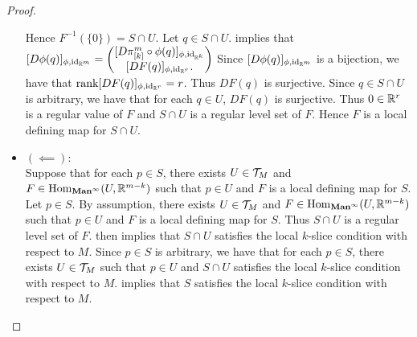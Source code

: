 \documentclass{book}
\begin{document}
\begin{proof}
\begin{itemize}
			Hence $F^{-1}(\{0\}) = S \cap U$. Let $q \in S \cap U$.  implies that $[D \phi (q)]_{\phi, \operatorname{id}_{\mathbb{R}^m}} = 
			\begin{pmatrix}
				[D \pi^m_{[k]} \circ \phi (q) ]_{\phi, \operatorname{id}_{\mathbb{R}^k}} \\
				[DF(q)]_{\phi, \operatorname{id}_{\mathbb{R}^r}}. 
			\end{pmatrix}
			$ 
			Since $[D \phi (q)]_{\phi, \operatorname{id}_{\mathbb{R}^m}}$ is a bijection, we have that $\operatorname{\text{rank}} [DF(q)]_{\phi, \operatorname{id}_{\mathbb{R}^r}} = r$. Thus $DF(q)$ is surjective. Since $q \in S \cap U$ is arbitrary, we have that for each $q \in U$, $DF(q)$ is surjective. Thus $0 \in \mathbb{R}^r$ is a regular value of $F$ and $S \cap U$ is a regular level set of $F$. Hence $F$ is a local defining map for $S \cap U$.
			\item $(\impliedby):$ \\
			Suppose that for each $p \in S$, there exists $U \in \mathcal{T}_M$ and $F \in \operatorname{Hom}_{\operatorname*{\text{\textbf{Man}}^{\infty}}}(U, \mathbb{R}^{m-k})$ such that $p \in U$ and $F$ is a local defining map for $S$. Let $p \in S$. By assumption, there exists $U \in \mathcal{T}_M$ and $F \in \operatorname{Hom}_{\operatorname*{\text{\textbf{Man}}^{\infty}}}(U, \mathbb{R}^{m-k})$ such that $p \in U$ and  $F$ is a local defining map for $S$. Thus $S \cap U$ is a regular level set of $F$.  then implies that $S \cap U$ satisfies the local $k$-slice condition with respect to $M$. Since $p \in S$ is arbitrary, we have that for each $p \in S$, there exists $U \in \mathcal{T}_M$ such that $p \in U$ and $S \cap U$ satisfies the local $k$-slice condition with respect to $M$.  \rex{} implies that $S$ satisfies the local $k$-slice condition with respect to $M$.
		\end{itemize}
	\end{proof}
	
	
	

	
	
	
	
	
	
	
	
	
	
	
	
	
	
	
	
	
	
	
	
	
	
	
	
	
	
\end{document}
